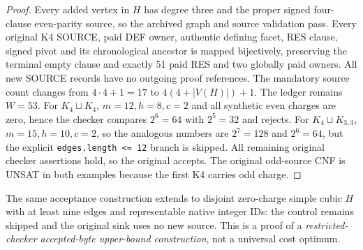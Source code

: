 \documentclass[11pt]{article}
\begin{document}
\begin{proof}
Every added vertex in $H$ has degree three and the proper signed four-clause even-parity source, so the archived graph and source validation pass. Every original K4 SOURCE, paid DEF owner, authentic defining facet, RES clause, signed pivot and its chronological ancestor is mapped bijectively, preserving the terminal empty clause and exactly 51 paid RES and two globally paid owners. All new SOURCE records have no outgoing proof references. The mandatory source count changes from $4\cdot4+1=17$ to $4(4+|V(H)|)+1$. The ledger remains $W=53$.
For $K_4\sqcup K_4$, $m=12,h=8,c=2$ and all synthetic even charges are zero, hence the checker compares $2^6=64$ with $2^5=32$ and rejects. For $K_4\sqcup K_{3,3}$, $m=15,h=10,c=2$, so the analogous numbers are $2^7=128$ and $2^6=64$, but the explicit \texttt{edges.length <= 12} branch is skipped. All remaining original checker assertions hold, so the original accepts. The original odd-source CNF is UNSAT in both examples because the first K4 carries odd charge.
\end{proof}
\noindent The same acceptance construction extends to disjoint zero-charge simple cubic $H$ with at least nine edges and representable native integer IDs: the control remains skipped and the original sink uses no new source. This is a proof of a \emph{restricted-checker accepted-byte upper-bound construction}, not a universal cost optimum.
\end{document}
